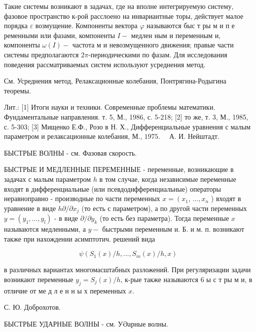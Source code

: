 \documentclass[10pt]{article}
\begin{document}
Такие системы возникают в задачах, где на вполне интегрируемую систему, фазовое пространство к-рой расслоено на инвариантные торы, действует малое порядка $\varepsilon$ возмущение. Компоненты вектора $\varphi$ называются быс т ры м и п е ременными или фазами, компоненты $I-$ медлен ным и переменным и, компоненты $\omega(I)-$ частота м и невозмущенного движения; правые части системы предполагаются $2 \pi$-периодическими по фазам. Для исследования поведения рассматриваемых систем используют усреднения метод.



См. Усреднения метод, Релаксационные колебания, Понтрягина-Родыгина теоремы.



Лит.: [1] Итоги науки и техники. Современные проблемы математики. Фундаментальные направления. т. 5, М., 1986, с. 5-218; [2] то же, т. 3, М., 1985, с. 5-303; [3] Мищенко Е.Ф., Розо в Н. Х., Дифференциальные уравнения с малым параметром и релаксационные колебания, М., $1975 . \quad$ А. И. Нейштадт.



БЫСТРЫЕ ВОЛНЫ - см. Фазовая скорость.



БЫСТРЫЕ И МЕДЛЕННЫЕ ПЕРЕМЕННЫЕ - переменные, возникающие в задачах с малым параметром $h$ в том случае, когда независимые переменные входят в дифференциальные (или псевдодифференциальные) операторы неравноправно - производные по части переменных $x=\left(x_{1}\right.$, $\ldots, x_{n}$ ) входят в уравнение в виде $h \partial / \partial x_{j}$ (то есть с параметром), а по другой части переменных $y=\left(y_{1}, \ldots, y_{l}\right)$ - в виде $\partial / \partial y_{k}$ (то есть без параметра). Тогда переменные $x$ называются медленными, а $y-$ быстрыми переменным и. Б. и м. п. возникают также при нахождении асимптотич. решений вида



\[

\psi\left(S_{1}(x) / h, \ldots, S_{m}(x) / h, x\right)

\]



в различных вариантах многомасштабных разложений. При регуляризации задачи возникают переменные $y_{j}=S_{j}(x) / h$, к-рые также называются 6 ы с т ры м и, в отличие от ме д л е н н ы х переменных $x$.



С. Ю. Доброхотов.



БЫСТРЫЕ УДАРНЫЕ ВОЛНЫ - см. УӘарные волны.
\end{document}
